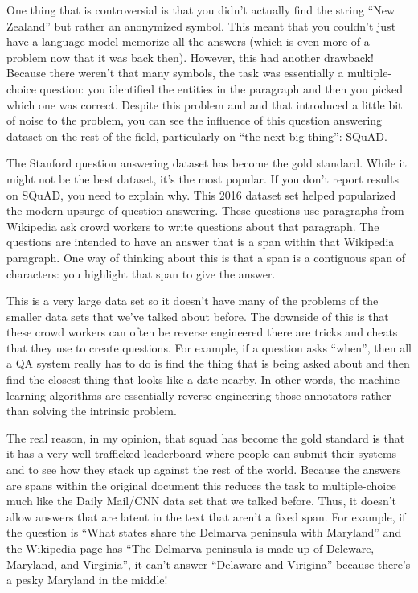 One thing that is controversial is that you didn’t actually find the string “New Zealand” but rather an anonymized symbol.  This meant that you couldn’t just have a language model memorize all the answers (which is even more of a problem now that it was back then).  However, this had another drawback!  Because there weren’t that many symbols, the task was essentially a multiple-choice question: you identified the entities in the paragraph and then you picked which one was correct.  Despite this problem and and that introduced a little bit of noise to the problem, you can see the influence of this question answering dataset on the rest of the field, particularly on “the next big thing”: SQuAD.

The Stanford question answering dataset has become the gold standard.  While it might not be the best dataset, it’s the most popular.  If you don't report results on SQuAD, you need to explain why.  This 2016 dataset set helped popularized the modern upsurge of question answering.  These questions use paragraphs from Wikipedia ask crowd workers to write questions about that paragraph.  The questions are intended to have an answer that is a span within that Wikipedia paragraph.  One way of thinking about this is that a span is a contiguous span of characters: you highlight that span to give the answer.

This is a very large data set so it doesn't have many of the problems of the smaller data sets that we've talked about before. The downside of this is that these crowd workers can often be reverse engineered there are tricks and cheats that they use to create questions.  For example, if a question asks “when”, then all a QA system really has to do is find the thing that is being asked about and then find the closest thing that looks like a date nearby.  In other words, the machine learning algorithms are essentially reverse engineering those annotators rather than solving the intrinsic problem.

The real reason, in my opinion, that squad has become the gold standard is that it has a very well trafficked leaderboard where people can submit their systems and to see how they stack up against the rest of the world.  Because the answers are spans within the original document this reduces the task to multiple-choice much like the Daily Mail/CNN data set that we talked before.  Thus, it doesn't allow answers that are latent in the text that aren’t a fixed span.  For example, if the question is “What states share the Delmarva peninsula with Maryland” and the Wikipedia page has “The Delmarva peninsula is made up of Deleware, Maryland, and Virginia”, it can’t answer “Delaware and Virigina” because there’s a pesky Maryland in the middle!

